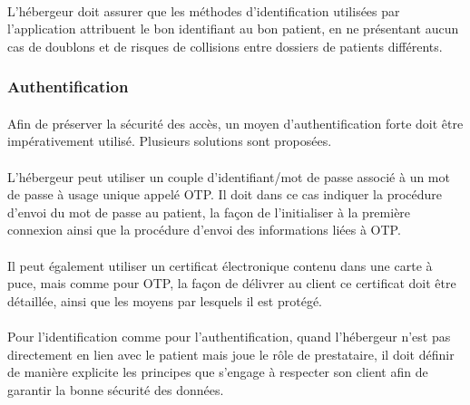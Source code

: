 \paragraph{}
L'hébergeur doit assurer que les méthodes d'identification utilisées par
l'application attribuent le bon identifiant au bon patient, en ne présentant
aucun cas de doublons et de risques de collisions entre dossiers de patients
différents.

            \subsubsection{Authentification}

\paragraph{}
Afin de préserver la sécurité des accès, un moyen d'authentification forte doit
être impérativement utilisé. Plusieurs solutions sont proposées.

\paragraph{}
L'hébergeur peut utiliser un couple d'identifiant/mot de passe associé à un
mot de passe à usage unique appelé OTP\@. Il doit dans ce cas indiquer la
procédure d'envoi du mot de passe au patient, la façon de l'initialiser à la
première connexion ainsi que la procédure d'envoi des informations liées à
OTP\@.

\paragraph{}
Il peut également utiliser un certificat électronique contenu dans une carte à
puce, mais comme pour OTP, la façon de délivrer au client ce certificat doit
être détaillée, ainsi que les moyens par lesquels il est protégé.

\paragraph{}
Pour l'identification comme pour l'authentification, quand l'hébergeur n'est
pas directement en lien avec le patient mais joue le rôle de prestataire, il
doit définir de manière explicite les principes que s'engage à respecter son
client afin de garantir la bonne sécurité des données.


